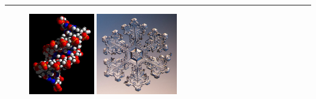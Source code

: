 \documentclass[12pt,a4paper]{article}
\begin{document}
\hrule{}

\begin{figure}[h]
\hfill
{}
\hfill
\includegraphics[height=100pt]{images/adn.jpg}
\hfill
\includegraphics[height=100pt]{images/flocon_neige.jpg}


\end{figure}
\end{document}
